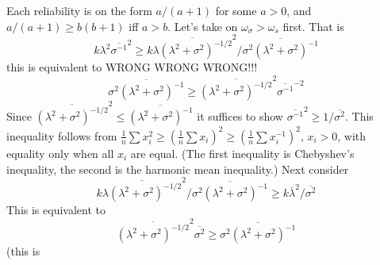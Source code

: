 \documentclass{article}
\makeatletter
\theoremstyle{plain}
\theoremstyle{plain}
\theoremstyle{definition}
\theoremstyle{remark}
\theoremstyle{definition}
\theoremstyle{plain}
\theoremstyle{plain}
\theoremstyle{definition}
\newenvironment{proof}[1][\protect\proofname]{\par
	\normalfont\topsep6\p@\@plus6\p@\relax
	\trivlist
	\itemindent\parindent
	\item[\hskip\labelsep\scshape #1]\ignorespaces
}{%
	\endtrivlist\@endpefalse
}
\providecommand{\proofname}{Proof}
\makeatother
\begin{document}
\begin{proof}[Proof of Proposition \ref{prop:Properties of three}]\label{proof:Properties}
Each reliability is on the form $a/(a+1)$ for some $a>0$, and $a/(a+1)\geq b(b+1)$
iff $a>b$. Let's take on $\omega_{\sigma}>\omega_{s}$ first. That
is
\[
k\lambda^{2}\overline{\sigma^{-1}}^{2}\geq k\overline{\lambda(\lambda^{2}+\sigma^{2})^{-1/2}}^{2}/\overline{\sigma^{2}(\lambda^{2}+\sigma^{2})^{-1}}
\]
this is equivalent to WRONG WRONG WRONG!!!
\[
\overline{\sigma^{2}(\lambda^{2}+\sigma^{2})^{-1}}\geq\overline{(\lambda^{2}+\sigma^{2})^{-1/2}}^{2}\overline{\sigma^{-1}}^{-2}
\]
Since $\overline{(\lambda^{2}+\sigma^{2})^{-1/2}}^{2}\leq\overline{(\lambda^{2}+\sigma^{2})^{-1}}$
it suffices to show $\overline{\sigma^{-1}}^{2}\geq1/\overline{\sigma^{2}}$.
This inequality follows from $\frac{1}{n}\sum x_{i}^{2}\geq\left(\frac{1}{n}\sum x_{i}\right)^{2}\geq\left(\frac{1}{n}\sum x_{i}^{-1}\right)^{2}$,
$x_{i}>0$, with equality only when all $x_{i}$ are equal. (The first
inequality is Chebyshev's inequality, the second is the harmonic mean
inequality.) Next consider
\[
k\overline{\lambda(\lambda^{2}+\sigma^{2})^{-1/2}}^{2}/\overline{\sigma^{2}(\lambda^{2}+\sigma^{2})^{-1}}\geq k\overline{\lambda}^{2}/\overline{\sigma^{2}}
\]
This is equivalent to 
\[
\overline{(\lambda^{2}+\sigma^{2})^{-1/2}}^{2}\overline{\sigma^{2}}\geq\overline{\sigma^{2}(\lambda^{2}+\sigma^{2})^{-1}}
\]
(this is
\end{proof}


  

\end{document}
